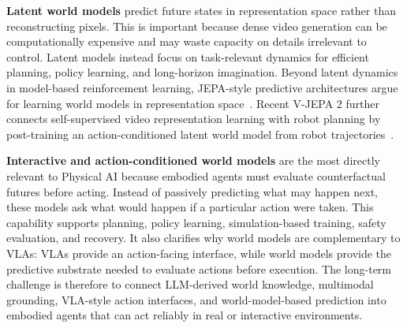 \noindent\textbf{Latent world models} predict future states in representation space rather than reconstructing pixels. 
This is important because dense video generation can be computationally expensive and may waste capacity on details irrelevant to control. 
Latent models instead focus on task-relevant dynamics for efficient planning, policy learning, and long-horizon imagination. 
Beyond latent dynamics in model-based reinforcement learning, JEPA-style predictive architectures argue for learning world models in representation space~\citep{lecun2022path,assran2023ijepa,bardes2024vjepa}. 
Recent V-JEPA 2 further connects self-supervised video representation learning with robot planning by post-training an action-conditioned latent world model from robot trajectories~\citep{assran2025vjepa2}. 

\noindent\textbf{Interactive and action-conditioned world models} are the most directly relevant to Physical AI because embodied agents must evaluate counterfactual futures before acting. 
Instead of passively predicting what may happen next, these models ask what would happen if a particular action were taken. 
This capability supports planning, policy learning, simulation-based training, safety evaluation, and recovery. 
It also clarifies why world models are complementary to VLAs: VLAs provide an action-facing interface, while world models provide the predictive substrate needed to evaluate actions before execution. 
The long-term challenge is therefore to connect LLM-derived world knowledge, multimodal grounding, VLA-style action interfaces, and world-model-based prediction into embodied agents that can act reliably in real or interactive environments.




